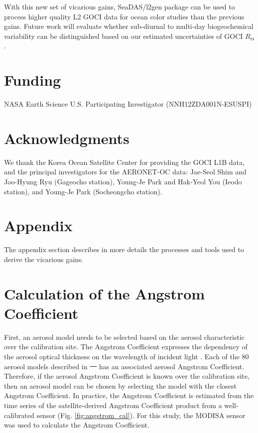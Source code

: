 \documentclass[]{interact}
\theoremstyle{plain}%
\theoremstyle{definition}
\theoremstyle{remark}
\providecommand{\DIFaddtex}[1]{{\protect\color{blue}\uwave{#1}}} %
\providecommand{\DIFdeltex}[1]{{\protect\color{red}\sout{#1}}}                      %
\providecommand{\DIFaddbegin}{} %
\providecommand{\DIFaddend}{} %
\providecommand{\DIFdelbegin}{} %
\providecommand{\DIFdelend}{} %
\providecommand{\DIFadd}[1]{\texorpdfstring{\DIFaddtex{#1}}{#1}} %
\providecommand{\DIFdel}[1]{\texorpdfstring{\DIFdeltex{#1}}{}} %
\newcommand{\DIFscaledelfig}{0.5}
\newlength{\DIFdelgraphicswidth} %
\newlength{\DIFdelgraphicsheight} %
\newcommand{\DIFaddincludegraphics}[2][]{{\color{blue}\fbox{\DIFOincludegraphics[#1]{#2}}}} %
\newcommand{\DIFdelincludegraphics}[2][]{%
\sbox{\DIFdelgraphicsbox}{\DIFOincludegraphics[#1]{#2}}%
\settoboxwidth{\DIFdelgraphicswidth}{\DIFdelgraphicsbox} %
\settoboxtotalheight{\DIFdelgraphicsheight}{\DIFdelgraphicsbox} %
\scalebox{\DIFscaledelfig}{%
\parbox[b]{\DIFdelgraphicswidth}{\usebox{\DIFdelgraphicsbox}\\[-\baselineskip] \rule{\DIFdelgraphicswidth}{0em}}\llap{\resizebox{\DIFdelgraphicswidth}{\DIFdelgraphicsheight}{%
\setlength{\unitlength}{\DIFdelgraphicswidth}%
\begin{picture}(1,1)%
\thicklines\linethickness{2pt} %
{\color[rgb]{1,0,0}\put(0,0){\framebox(1,1){}}}%
{\color[rgb]{1,0,0}\put(0,0){\line( 1,1){1}}}%
{\color[rgb]{1,0,0}\put(0,1){\line(1,-1){1}}}%
\end{picture}%
}\hspace*{3pt}}} %
} %
\DeclareRobustCommand{\DIFaddbegin}{\DIFOaddbegin \let\includegraphics\DIFaddincludegraphics} %
\DeclareRobustCommand{\DIFaddend}{\DIFOaddend \let\includegraphics\DIFOincludegraphics} %
\DeclareRobustCommand{\DIFdelbegin}{\DIFOdelbegin \let\includegraphics\DIFdelincludegraphics} %
\DeclareRobustCommand{\DIFdelend}{\DIFOaddend \let\includegraphics\DIFOincludegraphics} %
\begin{document}
With this new set of vicarious gains, SeaDAS/l2gen package can be used to process higher quality L2 GOCI data for ocean color studies than the previous gains. Future work will evaluate whether sub-diurnal to multi-day biogeochemical variability can be distinguished based on our estimated uncertainties of GOCI $R_\text{rs}$. 

\section*{Funding}
NASA Earth Science U.S. Participating Investigator (NNH12ZDA001N-ESUSPI) 
\section*{Acknowledgments}
We thank the Korea Ocean Satellite Center for providing the GOCI L1B data, and the principal investigators for the AERONET-OC data: Jae-Seol Shim and Joo-Hyung Ryu (Gageocho station), Young-Je Park and Hak-Yeol You (Ieodo station), and Young-Je Park (Socheongcho station). 



\appendix
\section*{Appendix}
The appendix section describes in more details the processes and tools used to derive the vicarious gains.

\section{Calculation of the Angstrom Coefficient}\label{sec:appendix_Angstrom}
First, an aerosol model needs to be selected based on the aerosol characteristic over the calibration site. The Angstrom Coefficient expresses the dependency of the aerosol optical thickness on the wavelength of incident light \citep{Wang:2005}. Each of the 80 aerosol models described in \DIFdelbegin \DIFdel{\mbox{%
\citep{Ahmad2010} }%
}\DIFdelend \DIFaddbegin \DIFadd{\mbox{%
\cite{Ahmad2010} }%
}\DIFaddend has an associated aerosol Angstrom Coefficient. Therefore, if the aerosol Angstrom Coefficient is known over the calibration site, then an aerosol model can be chosen by selecting the model with the closest Angstrom Coefficient. In practice, the Angstrom Coefficient is estimated from the time series of the satellite-derived Angstrom Coefficient product from a well-calibrated sensor (Fig. \ref{fig:angstrom_cal}). For this study, the MODISA sensor was used to calculate the Angstrom Coefficient.
\end{document}
